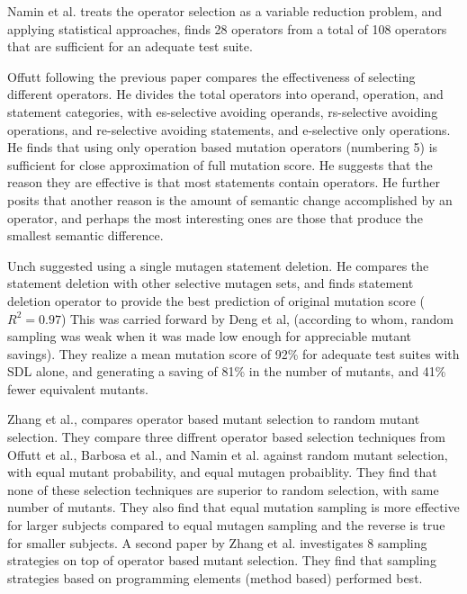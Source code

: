 Namin et al.\cite{namin2006finding,siami2008sufficient} treats the operator selection as a variable reduction problem, and applying statistical approaches, finds 28 operators from a total of 108 operators that are sufficient for an adequate test suite.

Offutt\cite{offutt1996anexperimental} following the previous paper\cite{offutt1993experimental} compares the effectiveness of selecting different operators. He divides the total operators into operand, operation, and statement categories, with es-selective avoiding operands, rs-selective avoiding operations, and re-selective avoiding statements, and e-selective only operations. He finds that using only operation based mutation operators (numbering 5) is sufficient for close approximation of full mutation score. He suggests that the reason they are effective is that most statements contain operators. He further posits that another reason is the amount of semantic change accomplished by an operator, and perhaps the most interesting ones are those that produce the smallest semantic difference.

Unch\cite{untch2009onreduced} suggested using a single mutagen statement deletion. He compares the statement deletion with other selective mutagen sets, and finds statement deletion operator to provide the best prediction of original mutation score ($R^2 = 0.97$)
This was carried forward by Deng et al\cite{deng2013empirical}, (according to whom, random sampling was weak when it was made low enough for appreciable mutant savings). They realize a mean mutation score of 92\% for adequate test suites with SDL alone, and generating a saving of 81\% in the number of mutants, and 41\% fewer equivalent mutants.

Zhang et al.\cite{zhang2010operator}, compares operator based mutant selection to random mutant selection. They compare three diffrent operator based selection techniques from Offutt et al., Barbosa et al., and Namin et al. against random mutant selection, with equal mutant probability, and equal mutagen probaiblity. They find that none of these selection techniques are superior to random selection, with same number of mutants. They also find that equal mutation sampling is more effective for larger subjects compared to equal mutagen sampling and the reverse is true for smaller subjects.
A second paper by Zhang et al.\cite{zhang2013ase} investigates 8 sampling strategies on top of operator based mutant selection. They find that sampling strategies based on programming elements (method based) performed best.

